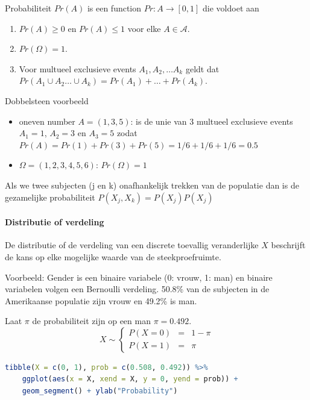 \documentclass[
  12pt,dutch,coursenotes]{book}
\providecommand{\tightlist}{%
  \setlength{\itemsep}{0pt}\setlength{\parskip}{0pt}}
\theoremstyle{definition}
\theoremstyle{definition}
\theoremstyle{definition}
\theoremstyle{definition}
\theoremstyle{remark}
\begin{document}
Probabiliteit \(Pr(A)\) is een function \(Pr: A \rightarrow [0,1]\) die voldoet aan

\begin{enumerate}
\def\labelenumi{\arabic{enumi}.}
\tightlist
\item
  \(Pr(A) \geq 0\) en \(Pr(A) \leq 1\) voor elke \(A \in \mathcal{A}\).
\item
  \(Pr(\Omega)=1\).
\item
  Voor multueel exclusieve events \(A_1, A_2, \ldots A_k\) geldt dat \(Pr(A_1 \cup A_2 \ldots \cup A_k)= Pr(A_1) + \ldots + Pr(A_k)\).
\end{enumerate}

Dobbelsteen voorbeeld

\begin{itemize}
\tightlist
\item
  oneven number \(A=(1,3,5)\): is de unie van 3 multueel exclusieve events \(A_1=1\), \(A_2=3\) en \(A_3=5\) zodat
  \(Pr(A)=Pr(1)+Pr(3)+Pr(5)=1/6+1/6+1/6=0.5\)
\item
  \(\Omega=(1,2,3,4,5,6)\): \(Pr(\Omega)=1\)
\end{itemize}

Als we twee subjecten (j en k) onafhankelijk trekken van de populatie dan is de gezamelijke probabiliteit
\(P(X_j,X_k)= P(X_j)P(X_j)\)

\hypertarget{distributie-of-verdeling}{%
\paragraph{Distributie of verdeling}\label{distributie-of-verdeling}}

De distributie of de verdeling van een discrete toevallig veranderlijke \(X\) beschrijft de kans op elke mogelijke waarde van de steekproefruimte.

Voorbeeld: Gender is een binaire variabele (0: vrouw, 1: man) en binaire variabelen volgen een Bernoulli verdeling. 50.8\% van de subjecten in de Amerikaanse populatie zijn vrouw en 49.2\% is man.

Laat \(\pi\) de probabiliteit zijn op een man \(\pi=0.492\).
\[ X\sim \left \{
    \begin{array}{lcl}
    P(X=0) &=& 1-\pi\\
    P(X=1) &=& \pi
    \end{array} \right . \]

\begin{lstlisting}[language=R]
tibble(X = c(0, 1), prob = c(0.508, 0.492)) %>%
    ggplot(aes(x = X, xend = X, y = 0, yend = prob)) +
    geom_segment() + ylab("Probability")
\end{lstlisting}
\end{document}
